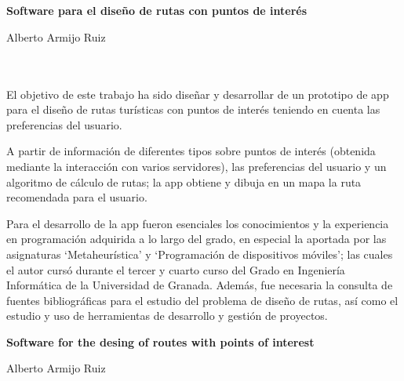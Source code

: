 \chapter*{}




\cleardoublepage
\thispagestyle{empty}

\begin{center}
	{\large\bfseries Software para el diseño de rutas con 
		puntos de interés}\\
\end{center}
\begin{center}
	Alberto Armijo Ruiz\\
\end{center}
\\

\vspace{0.7cm}
\\

El objetivo de este trabajo ha sido diseñar y desarrollar de un prototipo de app para el diseño de rutas turísticas con puntos de interés teniendo en cuenta las preferencias del usuario.\newline

A partir de información de diferentes tipos sobre puntos de interés (obtenida mediante la interacción con varios servidores), las preferencias del usuario y un algoritmo de cálculo de rutas; la app obtiene y dibuja en un mapa la ruta recomendada para el usuario.\newline

Para el desarrollo de la app fueron esenciales los conocimientos y la experiencia en programación adquirida a lo largo del grado, en especial la aportada por las asignaturas \enquote*{Metaheurística} y \enquote*{Programación de dispositivos móviles}; las cuales el autor cursó durante el tercer y cuarto curso del Grado en Ingeniería Informática de la Universidad de Granada. Además, fue necesaria la consulta de fuentes bibliográficas para el estudio del problema de diseño de rutas, así como el estudio y uso de herramientas de desarrollo y gestión de proyectos. 

\cleardoublepage


\thispagestyle{empty}


\begin{center}
{\large\bfseries Software for the desing of routes with points of interest}\\
\end{center}
\begin{center}
Alberto Armijo Ruiz\\
\end{center}

